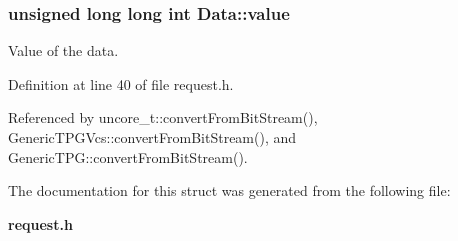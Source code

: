 \subsubsection[{value}]{\setlength{\rightskip}{0pt plus 5cm}unsigned long long int {\bf Data::value}}\label{structData_be8f049430369f7682bcee5a12072b4f}


Value of the data. 



Definition at line 40 of file request.h.

Referenced by uncore\_\-t::convertFromBitStream(), GenericTPGVcs::convertFromBitStream(), and GenericTPG::convertFromBitStream().

The documentation for this struct was generated from the following file:\begin{CompactItemize}
\item 
{\bf request.h}\end{CompactItemize}
